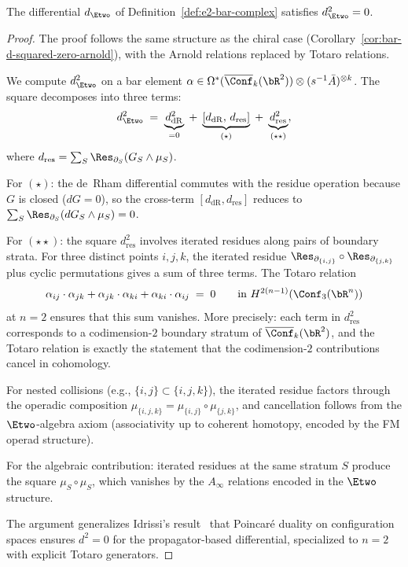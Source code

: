 \begin{theorem}[\texorpdfstring{$d^2 = 0$}{d squared = 0} from Totaro relations;
\ClaimStatusProvedHere]
\label{thm:e2-d-squared}
The differential $d_{\Etwo}$ of
Definition~\textup{\ref{def:e2-bar-complex}} satisfies
$d_{\Etwo}^2 = 0$.
\end{theorem}

\begin{proof}
The proof follows the same structure as the chiral case
(Corollary~\ref{cor:bar-d-squared-zero-arnold}), with the Arnold
relations replaced by Totaro relations.

We compute $d_{\Etwo}^2$ on a bar element
$\alpha \in \Omega^*(\overline{\Conf}_k(\bR^2))
\otimes (s^{-1} \bar{A})^{\otimes k}$.
The square decomposes into three terms:
\[
d_{\Etwo}^2
\;=\;
\underbrace{d_{\mathrm{dR}}^2}_{= 0}
\;+\;
\underbrace{[d_{\mathrm{dR}},\, d_{\mathrm{res}}]}_{(\star)}
\;+\;
\underbrace{d_{\mathrm{res}}^2}_{(\star\star)},
\]
where $d_{\mathrm{res}} = \sum_S \Res_{\partial_S}(G_S \wedge \mu_S)$.

For $(\star)$: the de~Rham differential commutes with the residue
operation because $G$ is closed ($dG = 0$), so the cross-term
$[d_{\mathrm{dR}}, d_{\mathrm{res}}]$ reduces to
$\sum_S \Res_{\partial_S}(dG_S \wedge \mu_S) = 0$.

For $(\star\star)$: the square $d_{\mathrm{res}}^2$ involves
iterated residues along pairs of boundary strata. For three
distinct points $i, j, k$, the iterated residue
$\Res_{\partial_{\{i,j\}}} \circ \Res_{\partial_{\{j,k\}}}$
plus cyclic permutations gives a sum of three terms. The
Totaro relation
\[
\alpha_{ij} \cdot \alpha_{jk}
+ \alpha_{jk} \cdot \alpha_{ki}
+ \alpha_{ki} \cdot \alpha_{ij} \;=\; 0
\qquad
\text{in } H^{2(n-1)}(\Conf_3(\bR^n))
\]
at $n = 2$ ensures that this sum vanishes. More precisely: each
term in $d_{\mathrm{res}}^2$ corresponds to a codimension-$2$
boundary stratum of $\overline{\Conf}_k(\bR^2)$, and the Totaro
relation is exactly the statement that the codimension-$2$
contributions cancel in cohomology.

For nested collisions (e.g., $\{i, j\} \subset \{i, j, k\}$),
the iterated residue factors through the operadic composition
$\mu_{\{i,j,k\}} = \mu_{\{i,j\}} \circ \mu_{\{j,k\}}$, and
cancellation follows from the $\Etwo$-algebra axiom (associativity
up to coherent homotopy, encoded by the FM operad structure).

For the algebraic contribution: iterated residues at the same
stratum $S$ produce the square $\mu_S \circ \mu_S$, which vanishes
by the $A_\infty$ relations encoded in the $\Etwo$ structure.

The argument generalizes Idrissi's result~\cite{Idrissi22} that
Poincar\'e duality on configuration spaces ensures $d^2 = 0$ for
the propagator-based differential, specialized to $n = 2$ with
explicit Totaro generators.
\end{proof}

